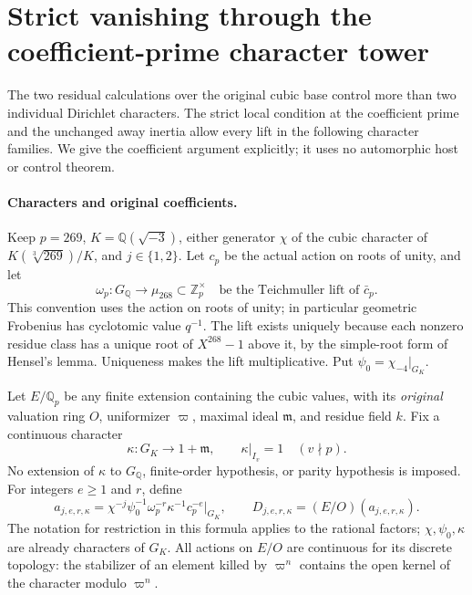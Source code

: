 \section{Strict vanishing through the coefficient-prime character tower}
\label{sec:cubic-prime-character-strict-vanishing}

The two residual calculations over the original cubic base control
more than two individual Dirichlet characters.  The strict local
condition at the coefficient prime and the unchanged away inertia
allow every lift in the following character families.  We give the
coefficient argument explicitly; it uses no automorphic host or
control theorem.

\paragraph{Characters and original coefficients.}
Keep \(p=269\), \(K=\mathbb Q(\sqrt{-3})\), either generator
\(\chi\) of the cubic character of \(K(\sqrt[3]{269})/K\),
and \(j\in\{1,2\}\).  Let \(c_p\) be the actual action on
roots of unity, and let
\[
 \omega_p:G_{\mathbb Q}\longrightarrow\mu_{268}\subset\mathbb Z_p^\times
 \quad\text{be the Teichmuller lift of }\bar c_p.
 \tag{G125.1}
\]
This convention uses the action on roots of unity; in particular
geometric Frobenius has cyclotomic value \(q^{-1}\).
The lift exists uniquely because each nonzero residue class has a
unique root of \(X^{268}-1\) above it, by the simple-root form of
Hensel's lemma.  Uniqueness makes the lift multiplicative.
Put \(\psi_0=\chi_{-4}|_{G_K}\).

Let \(E/\mathbb Q_p\) be any finite extension containing the
cubic values, with its \emph{original} valuation ring \(O\),
uniformizer \(\varpi\), maximal ideal \(\mathfrak m\), and
residue field \(k\).  Fix a continuous character
\[
 \kappa:G_K\longrightarrow 1+\mathfrak m,
 \qquad \kappa|_{I_v}=1\quad(v\nmid p).
 \tag{G125.2}
\]
No extension of \(\kappa\) to \(G_{\mathbb Q}\), finite-order
hypothesis, or parity hypothesis is imposed.  For integers
\(e\ge1\) and \(r\), define
\[
 a_{j,e,r,\kappa}
   =\chi^{-j}\psi_0^{-1}\omega_p^{-r}\kappa^{-1}c_p^{-e}|_{G_K},
 \qquad D_{j,e,r,\kappa}=(E/O)(a_{j,e,r,\kappa}).
 \tag{G125.3}
\]
The notation for restriction in this formula applies to the
rational factors; \(\chi,\psi_0,\kappa\) are already characters
of \(G_K\).  All actions on \(E/O\) are continuous for its
discrete topology: the stabilizer of an element killed by
\(\varpi^n\) contains the open kernel of the character modulo
\(\varpi^n\).

